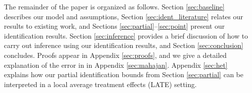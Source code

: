 The remainder of the paper is organized as follows.
Section \ref{sec:baseline} describes our model and assumptions, Section \ref{sec:ident_literature} relates our results to existing work, and Sections \ref{sec:partial}--\ref{sec:point} present our identification results.
Section \ref{sec:inference} provides a brief discussion of how to carry out inference using our identification results, and Section \ref{sec:conclusion} concludes.
Proofs appear in Appendix \ref{sec:proofs}, and we give a detailed explanation of the error in \cite{Mahajan} in Appendix \ref{sec:mahajan}.
Appendix \ref{sec:het} explains how our partial identification bounds from Section \ref{sec:partial} can be interpreted in a local average treatment effects (LATE) setting.


